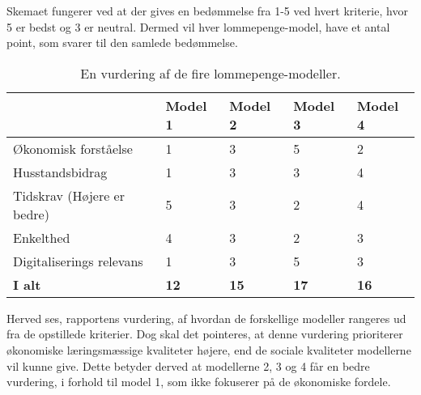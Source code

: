 \noindent Skemaet fungerer ved at der gives en bedømmelse fra 1-5 ved hvert kriterie, hvor 5 er bedst og 3 er neutral. Dermed vil hver lommepenge-model, have et antal point, som svarer til den samlede bedømmelse.\\


\begin{table}[htb]
   \centering
   \begin{tabular}{| l | l | l | l | l |} 
   \hline
   & \textbf{Model 1} & \textbf{Model 2} & \textbf{Model 3} & \textbf{Model 4} \\ \hline
   Økonomisk forståelse & 1 & 3 & 5 & 2 \\ \hline
   Husstandsbidrag & 1 & 3 & 3 & 4 \\ \hline
   Tidskrav (Højere er bedre) & 5 & 3 & 2 & 4 \\ \hline
   Enkelthed & 4 & 3 & 2 & 3 \\ \hline
   Digitaliserings relevans & 1 & 3 & 5 & 3 \\ \hline
   \textbf{I alt} & \textbf{12} & \textbf{15} & \textbf{17} & \textbf{16} \\ \hline
   \end{tabular}
   \caption{En vurdering af de fire lommepenge-modeller.}
\end{table}

\noindent Herved ses, rapportens vurdering, af hvordan de forskellige modeller rangeres ud fra de opstillede kriterier.
Dog skal det pointeres, at denne vurdering prioriterer økonomiske læringsmæssige kvaliteter højere, end de sociale kvaliteter modellerne vil kunne give.
Dette betyder derved at modellerne 2, 3 og 4 får en bedre vurdering, i forhold til model 1, som ikke fokuserer på de økonomiske fordele. 
